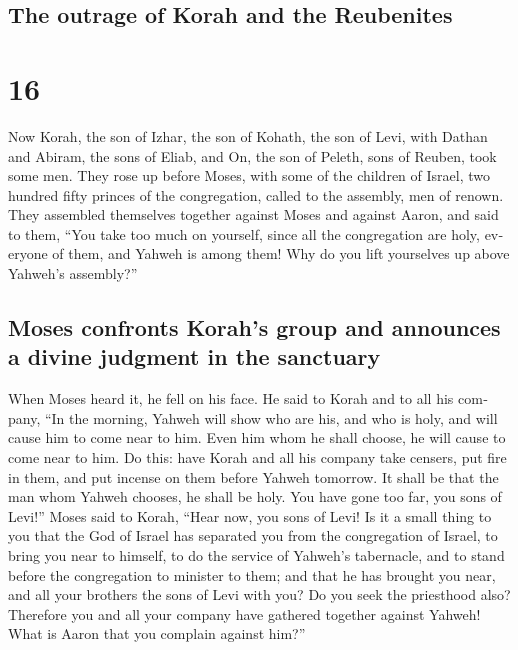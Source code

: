 \begin{paracol}{2}
\switchcolumn
\begin{otherlanguage}{english}

\hypertarget{the-outrage-of-korah-and-the-reubenites}{%
\subsection{The outrage of Korah and the
Reubenites}\label{the-outrage-of-korah-and-the-reubenites}}

\hypertarget{section-31}{%
\section{16}\label{section-31}}

 Now Korah, the son of Izhar, the son of Kohath, the son
of Levi, with Dathan and Abiram, the sons of Eliab, and On, the son of
Peleth, sons of Reuben, took some men.  They rose up
before Moses, with some of the children of Israel, two hundred fifty
princes of the congregation, called to the assembly, men of renown.
 They assembled themselves together against Moses and
against Aaron, and said to them, ``You take too much on yourself, since
all the congregation are holy, everyone of them, and Yahweh is among
them! Why do you lift yourselves up above Yahweh's assembly?''

\hypertarget{moses-confronts-korahs-group-and-announces-a-divine-judgment-in-the-sanctuary}{%
\subsection{Moses confronts Korah's group and announces a divine
judgment in the
sanctuary}\label{moses-confronts-korahs-group-and-announces-a-divine-judgment-in-the-sanctuary}}

 When Moses heard it, he fell on his face. 
He said to Korah and to all his company, ``In the morning, Yahweh will
show who are his, and who is holy, and will cause him to come near to
him. Even him whom he shall choose, he will cause to come near to him.
 Do this: have Korah and all his company take censers,
 put fire in them, and put incense on them before Yahweh
tomorrow. It shall be that the man whom Yahweh chooses, he shall be
holy. You have gone too far, you sons of Levi!''  Moses
said to Korah, ``Hear now, you sons of Levi!  Is it a
small thing to you that the God of Israel has separated you from the
congregation of Israel, to bring you near to himself, to do the service
of Yahweh's tabernacle, and to stand before the congregation to minister
to them;  and that he has brought you near, and all your
brothers the sons of Levi with you? Do you seek the priesthood also?
 Therefore you and all your company have gathered
together against Yahweh! What is Aaron that you complain against him?''


\end{otherlanguage}
\end{paracol}
